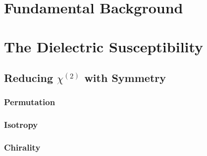 \section{Fundamental Background}\label{sec:background:NonlinearOptics:background}
\section{The Dielectric Susceptibility}\label{sec:background:NonlinearOptics:susceptibility}
\subsection{Reducing \texorpdfstring{$\chi^{(2)}$}{Lg} with Symmetry}\label{sec:background:NonlinearOptics:tensorsymmetry}
\subsubsection{Permutation}\label{sec:background:NonlinearOptics:tensorsymmetry:permutation}
\subsubsection{Isotropy}\label{sec:background:NonlinearOptics:tensorsymmetry:isotropy}
\subsubsection{Chirality}\label{sec:background:NonlinearOptics:tensorsymmetry:chirality}